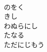 \documentclass[10pt,b5j]{tarticle} %
\begin{document}
\begin{enumerate}
\begin{minipage}[c]{\blocksize}
    \end{minipage}
    \begin{minipage}[c]{\blocksize}
        
        \vspace{\linespace}
        \item~\\
        のをく\\
        きし\\
        わぬらにし\\
        たなる\\
        ただにじもう
    
    \end{minipage}
\end{enumerate} %
\end{document}
